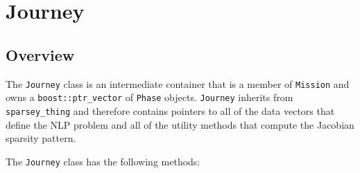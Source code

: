 \chapter{Journey}
\label{chap:journey}

\section{Overview}
\label{sec:journey_overview}

The \texttt{Journey} class is an intermediate container that is a member of \texttt{Mission} and owns a \texttt{boost::ptr\_vector} of \texttt{Phase} objects. \texttt{Journey} inherits from \texttt{sparsey\_thing} and therefore contains pointers to all of the data vectors that define the \ac{NLP} problem and all of the utility methods that compute the Jacobian sparsity pattern.

The \texttt{Journey} class has the following methods:


